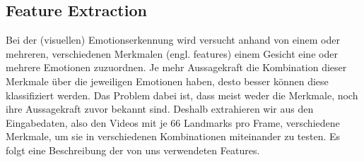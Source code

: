 \subsection{Feature Extraction}
Bei der (visuellen) Emotionserkennung wird versucht anhand von einem oder mehreren, verschiedenen Merkmalen (engl. features)
einem Gesicht eine oder mehrere Emotionen zuzuordnen. Je mehr Aussagekraft die Kombination dieser Merkmale über die jeweiligen Emotionen haben,
desto besser können diese klassifiziert werden. Das Problem dabei ist, dass meist weder die Merkmale, noch
ihre Aussagekraft zuvor bekannt sind. Deshalb extrahieren wir aus den Eingabedaten, also den Videos mit je 66 Landmarks pro
Frame, verschiedene Merkmale, um sie in verschiedenen Kombinationen miteinander zu testen. Es folgt eine Beschreibung
der von uns verwendeten Features.

